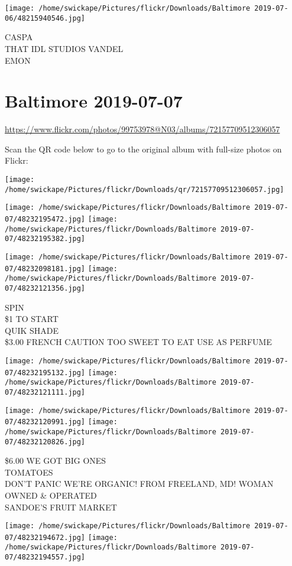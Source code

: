 \documentclass[10pt,letterpaper]{article}
\begin{document}
\texttt{[image: /home/swickape/Pictures/flickr/Downloads/Baltimore 2019-07-06/48215940546.jpg]}

CASPA\\
THAT IDL STUDIOS VANDEL\\
EMON
\pagebreak

\section*{Baltimore 2019-07-07}

\url{https://www.flickr.com/photos/99753978@N03/albums/72157709512306057}

Scan the QR code below to go to the original album with full-size photos on Flickr:

\texttt{[image: /home/swickape/Pictures/flickr/Downloads/qr/72157709512306057.jpg]}
\pagebreak

\texttt{[image: /home/swickape/Pictures/flickr/Downloads/Baltimore 2019-07-07/48232195472.jpg]}
\texttt{[image: /home/swickape/Pictures/flickr/Downloads/Baltimore 2019-07-07/48232195382.jpg]}

\texttt{[image: /home/swickape/Pictures/flickr/Downloads/Baltimore 2019-07-07/48232098181.jpg]}
\texttt{[image: /home/swickape/Pictures/flickr/Downloads/Baltimore 2019-07-07/48232121356.jpg]}

SPIN\\
\$1 TO START\\
QUIK SHADE\\
\$3.00 FRENCH CAUTION TOO SWEET TO EAT USE AS PERFUME
\pagebreak

\texttt{[image: /home/swickape/Pictures/flickr/Downloads/Baltimore 2019-07-07/48232195132.jpg]}
\texttt{[image: /home/swickape/Pictures/flickr/Downloads/Baltimore 2019-07-07/48232121111.jpg]}

\texttt{[image: /home/swickape/Pictures/flickr/Downloads/Baltimore 2019-07-07/48232120991.jpg]}
\texttt{[image: /home/swickape/Pictures/flickr/Downloads/Baltimore 2019-07-07/48232120826.jpg]}

\$6.00 WE GOT BIG ONES\\
TOMATOES\\
DON'T PANIC WE'RE ORGANIC!  FROM FREELAND, MD!  WOMAN OWNED \& OPERATED\\
SANDOE'S FRUIT MARKET
\pagebreak

\texttt{[image: /home/swickape/Pictures/flickr/Downloads/Baltimore 2019-07-07/48232194672.jpg]}
\texttt{[image: /home/swickape/Pictures/flickr/Downloads/Baltimore 2019-07-07/48232194557.jpg]}
\end{document}
